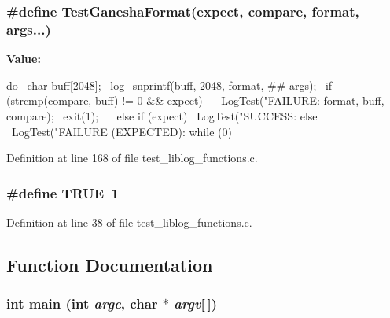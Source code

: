 \subsubsection[{TestGaneshaFormat}]{\setlength{\rightskip}{0pt plus 5cm}\#define TestGaneshaFormat(expect, \/  compare, \/  format, \/  args...)}\label{test__liblog__functions_8c_a2b94645c9a59cfd0a746803fd7ac2652}
{\bfseries Value:}
\begin{DoxyCode}
do {                                                  \
    char buff[2048];                                    \
    log_snprintf(buff, 2048, format, ## args);          \
    if (strcmp(compare, buff) != 0 && expect)           \
      {                                                 \
        LogTest("FAILURE: %
                format, buff, compare);                 \
        exit(1);                                        \
      }                                                 \
    else if (expect)                                    \
      LogTest("SUCCESS: %
    else                                                \
      LogTest("FAILURE (EXPECTED):  %
  } while (0)
\end{DoxyCode}


Definition at line 168 of file test\_\-liblog\_\-functions.c.
\subsubsection[{TRUE}]{\setlength{\rightskip}{0pt plus 5cm}\#define TRUE~1}\label{test__liblog__functions_8c_aa8cecfc5c5c054d2875c03e77b7be15d}


Definition at line 38 of file test\_\-liblog\_\-functions.c.

\subsection{Function Documentation}
\subsubsection[{main}]{\setlength{\rightskip}{0pt plus 5cm}int main (int {\em argc}, \/  char $\ast$ {\em argv}[$\,$])}\label{test__liblog__functions_8c_a0ddf1224851353fc92bfbff6f499fa97}


